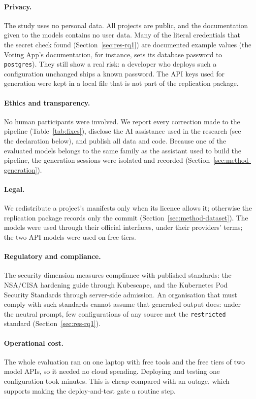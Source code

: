 \paragraph{Privacy.} The study uses no personal data. All projects are public, and the documentation given to the models contains no user data. Many of the literal credentials that the secret check found (Section~\ref{sec:res-rq1}) are documented example values (the Voting App's documentation, for instance, sets its database password to \texttt{postgres}). They still show a real risk: a developer who deploys such a configuration unchanged ships a known password. The API keys used for generation were kept in a local file that is not part of the replication package.

\paragraph{Ethics and transparency.} No human participants were involved. We report every correction made to the pipeline (Table~\ref{tab:fixes}), disclose the AI assistance used in the research (see the declaration below), and publish all data and code. Because one of the evaluated models belongs to the same family as the assistant used to build the pipeline, the generation sessions were isolated and recorded (Section~\ref{sec:method-generation}).

\paragraph{Legal.} We redistribute a project's manifests only when its licence allows it; otherwise the replication package records only the commit (Section~\ref{sec:method-dataset}). The models were used through their official interfaces, under their providers' terms; the two API models were used on free tiers.

\paragraph{Regulatory and compliance.} The security dimension measures compliance with published standards: the NSA/CISA hardening guide through Kubescape, and the Kubernetes Pod Security Standards through server-side admission. An organisation that must comply with such standards cannot assume that generated output does: under the neutral prompt, few configurations of any source met the \texttt{restricted} standard (Section~\ref{sec:res-rq1}).

\paragraph{Operational cost.} The whole evaluation ran on one laptop with free tools and the free tiers of two model APIs, so it needed no cloud spending. Deploying and testing one configuration took minutes. This is cheap compared with an outage, which supports making the deploy-and-test gate a routine step.
